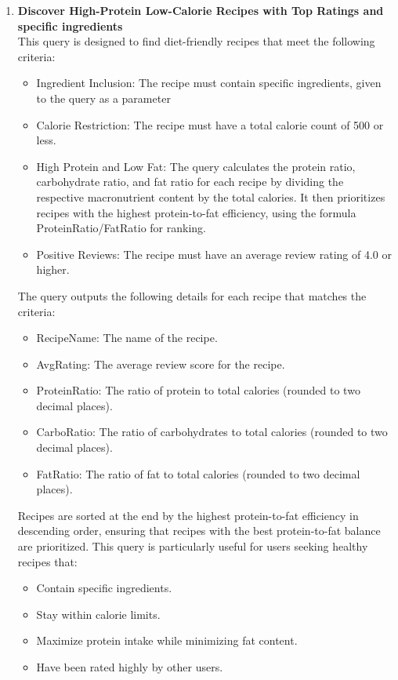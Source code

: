 \begin{enumerate}
    \clearpage
    \item {}
          \textbf{Discover High-Protein Low-Calorie Recipes with Top Ratings and specific ingredients}\\
    This query is designed to find diet-friendly recipes that meet the following criteria:
    \begin{itemize}
        \item Ingredient Inclusion: The recipe must contain specific ingredients, given to the query as a parameter
        \item Calorie Restriction: The recipe must have a total calorie count of 500 or less.
        \item  High Protein and Low Fat:
The query calculates the protein ratio, carbohydrate ratio, and fat ratio for each recipe by dividing the respective macronutrient content by the total calories.
It then prioritizes recipes with the highest protein-to-fat efficiency, using the formula ProteinRatio/FatRatio for ranking.
        \item Positive Reviews: The recipe must have an average review rating of 4.0 or higher.
    \end{itemize}
The query outputs the following details for each recipe that matches the criteria:
\begin{itemize}
    \item RecipeName: The name of the recipe.
    \item AvgRating: The average review score for the recipe.
    \item ProteinRatio: The ratio of protein to total calories (rounded to two decimal places).
    \item CarboRatio: The ratio of carbohydrates to total calories (rounded to two decimal places).
    \item FatRatio: The ratio of fat to total calories (rounded to two decimal places).
\end{itemize}
Recipes are sorted at the end by the highest protein-to-fat efficiency in descending order, ensuring that recipes with the best protein-to-fat balance are prioritized.
This query is particularly useful for users seeking healthy recipes that:
\begin{itemize}
    \item Contain specific ingredients.
    \item Stay within calorie limits.
    \item Maximize protein intake while minimizing fat content.
    \item Have been rated highly by other users.
\end{itemize}

\end{enumerate}
